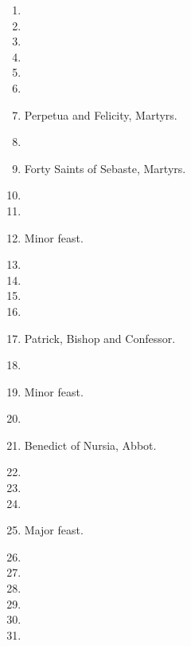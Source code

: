 	\begin{enumerate}
		\item %
		\item %
		\item %
		\item %
		\item %
		\item %
		\item Perpetua and Felicity, Martyrs. 
		\item %
		\item Forty Saints of Sebaste, Martyrs. 
		\item %
		\item %
		\item {} Minor feast.
		\item %
		\item %
		\item %
		\item %
		\item Patrick, Bishop and Confessor. 
		\item %
		\item {} Minor feast.
		\item %
		\item Benedict of Nursia, Abbot. 
		\item %
		\item %
		\item %
		\item {} Major feast.
		\item %
		\item %
		\item %
		\item %
		\item %
		\item %
		
	\end{enumerate}